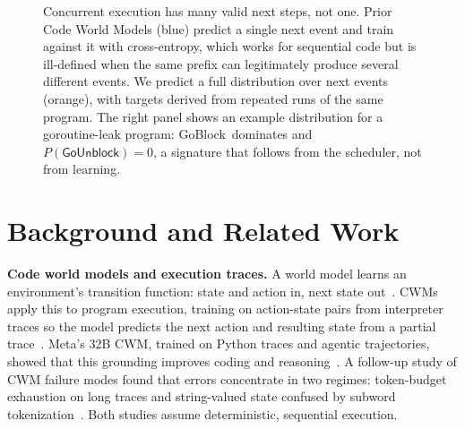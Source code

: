 \documentclass{svproc}
\newcommand{\pblock}{\textsf{GoBlock}}
\newcommand{\punblock}{\textsf{GoUnblock}}
\begin{document}
\begin{figure}[t]
{}%
\caption{Concurrent execution has many valid next steps, not one. Prior
Code World Models (blue) predict a single next event and train against
it with cross-entropy, which works for sequential code but is
ill-defined when the same prefix can legitimately produce several
different events. We predict a full distribution over next events
(orange), with targets derived from repeated runs of the same program.
The right panel shows an example distribution for a goroutine-leak
program: \pblock\ dominates and $P(\punblock)=0$, a signature that
follows from the scheduler, not from learning.}
\label{fig:teaser}
\end{figure}

\section{Background and Related Work}\label{sec:related}

\textbf{Code world models and execution traces.}
A world model learns an environment's transition function: state and
action in, next state out~\cite{cwm}. CWMs apply this to program
execution, training on action-state pairs from interpreter traces so
the model predicts the next action and resulting state from a partial
trace~\cite{cwm}. Meta's 32B CWM, trained on Python traces and agentic
trajectories, showed that this grounding improves coding and
reasoning~\cite{cwm}. A follow-up study of CWM failure modes found that
errors concentrate in two regimes: token-budget exhaustion on long
traces and string-valued state confused by subword
tokenization~\cite{debugcwm}. Both studies assume deterministic,
sequential execution.
\end{document}
